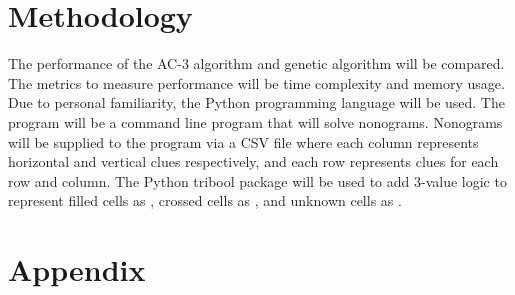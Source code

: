 \documentclass[12pt, letterpaper]{article}
\begin{document}
\section{Methodology}
The performance of the AC-3 algorithm and genetic algorithm will be compared. The metrics to measure performance will be time complexity and memory usage. Due to personal familiarity, the Python programming language will be used. The program will be a command line program that will solve nonograms. Nonograms will be supplied to the program via a CSV file where each column represents horizontal and vertical clues respectively, and each row represents clues for each row and column. The Python tribool package will be used to add 3-value logic to represent filled cells as , crossed cells as , and unknown cells as .
\newpage

\renewcommand{\thesubsection}{\Alph{subsection}}
\setcounter{page}{\value{lastroman}}
\section*{Appendix}


\newpage


\newpage
\listoffigures
\listoftables




\end{document}
